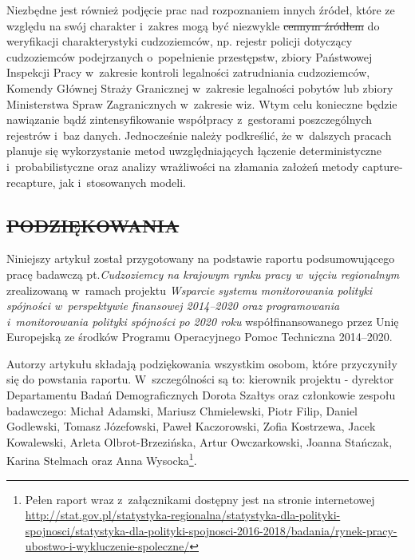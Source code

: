 \documentclass[12pt,a4paper]{article}
\providecommand{\DIFadd}[1]{{\protect\color{blue}\uwave{#1}}} %
\providecommand{\DIFdel}[1]{{\protect\color{red}\sout{#1}}}                      %
\providecommand{\DIFaddbegin}{} %
\providecommand{\DIFaddend}{} %
\providecommand{\DIFdelbegin}{} %
\providecommand{\DIFdelend}{} %
\begin{document}
Niezbędne jest również podjęcie prac nad rozpoznaniem innych źródeł, które ze względu na swój charakter i~zakres mogą być niezwykle \DIFdelbegin \DIFdel{cennym źródłem }\DIFdelend \DIFaddbegin \DIFadd{cenne }\DIFaddend do weryfikacji charakterystyki cudzoziemców, np. rejestr policji dotyczący cudzoziemców podejrzanych o~popełnienie przestępstw, zbiory Państwowej Inspekcji Pracy w~zakresie kontroli legalności zatrudniania cudzoziemców, Komendy Głównej Straży Granicznej w~zakresie legalności pobytów lub zbiory Ministerstwa Spraw Zagranicznych w~zakresie wiz. W\DIFaddbegin \DIFadd{~}\DIFaddend tym celu konieczne będzie nawiązanie bądź zintensyfikowanie współpracy z~gestorami poszczególnych rejestrów i~baz danych. Jednocześnie należy podkreślić, że w~dalszych pracach planuje się wykorzystanie metod uwzględniających łączenie deterministyczne i~probabilistyczne oraz analizy wrażliwości na złamania założeń metody capture-recapture, jak i~stosowanych modeli.


\begin{center}
\DIFdelbegin \section*{\DIFdel{PODZIĘKOWANIA}} 
\DIFdelend \DIFaddbegin \DIFadd{PODZIĘKOWANIA
}\DIFaddend \end{center}

Niniejszy artykuł został przygotowany na podstawie raportu podsumowującego pracę badawczą pt.\textit{Cudzoziemcy na krajowym rynku pracy w~ujęciu regionalnym} zrealizowaną w~ramach projektu \textit{Wsparcie systemu monitorowania polityki spójności w~perspektywie finansowej 2014--2020 oraz programowania i~monitorowania polityki spójności po 2020 roku} współfinansowanego przez Unię Europejską ze środków Programu Operacyjnego Pomoc Techniczna 2014--2020. 

Autorzy artykułu składają podziękowania wszystkim osobom, które przyczyniły się do powstania raportu. W~szczególności są to: kierownik projektu - dyrektor Departamentu Badań Demograficznych Dorota Szałtys oraz członkowie zespołu badawczego: Michał Adamski, Mariusz Chmielewski, Piotr Filip, Daniel Godlewski, Tomasz Józefowski, Paweł Kaczorowski, Zofia Kostrzewa, Jacek Kowalewski, Arleta Olbrot-Brzezińska, Artur Owczarkowski, Joanna Stańczak, Karina Stelmach oraz Anna Wysocka\footnote{Pełen raport wraz z~załącznikami dostępny jest na stronie internetowej \url{http://stat.gov.pl/statystyka-regionalna/statystyka-dla-polityki-spojnosci/statystyka-dla-polityki-spojnosci-2016-2018/badania/rynek-pracy-ubostwo-i-wykluczenie-spoleczne/}}.
\end{document}
